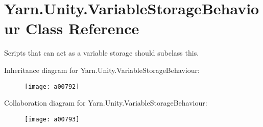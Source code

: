 \hypertarget{a00193}{\section{Yarn.\-Unity.\-Variable\-Storage\-Behaviour Class Reference}
\label{a00193}
}


Scripts that can act as a variable storage should subclass this.  




Inheritance diagram for Yarn.\-Unity.\-Variable\-Storage\-Behaviour\-:
\nopagebreak
\begin{figure}[H]
\begin{center}
\leavevmode
\texttt{[image: a00792]}
\end{center}
\end{figure}


Collaboration diagram for Yarn.\-Unity.\-Variable\-Storage\-Behaviour\-:
\nopagebreak
\begin{figure}[H]
\begin{center}
\leavevmode
\texttt{[image: a00793]}
\end{center}
\end{figure}

